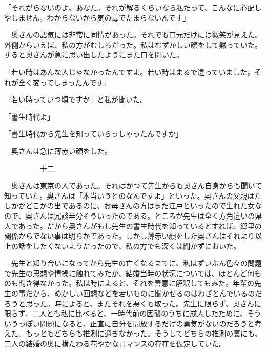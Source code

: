 \documentclass[a4j,onecolumn]{tarticle}
\begin{document}
「それがらないのよ、\hbox{}あなた。\hbox{}それが解るくらいなら私だって、\hbox{}こんなに心配しやしません。\hbox{}わからないから気の毒でたまらないんです」\par{}
　奥さんの語気には非常に同情があった。\hbox{}それでも口元だけには微笑が見えた。\hbox{}外側からいえば、\hbox{}私の方がむしろだった。\hbox{}私はむずかしい顔をして黙っていた。\hbox{}すると奥さんが急に思い出したようにまた口を開いた。\hbox{}\par{}
「若い時はあんな人じゃなかったんですよ。\hbox{}若い時はまるで違っていました。\hbox{}それが全く変ってしまったんです」\par{}
「若い時っていつ頃ですか」と私が聞いた。\hbox{}\par{}
「書生時代よ」\par{}
「書生時代から先生を知っていらっしゃったんですか」\par{}
　奥さんは急に薄赤い顔をした。\hbox{}\par{}\par{}　　　　　十二
\par{}
　奥さんは東京の人であった。\hbox{}それはかつて先生からも奥さん自身からも聞いて知っていた。\hbox{}奥さんは「本当いうとのなんですよ」といった。\hbox{}奥さんの父親はたしかかどこかの出であるのに、\hbox{}お母さんの方はまだ江戸といったので生れた女なので、\hbox{}奥さんは冗談半分そういったのである。\hbox{}ところが先生は全く方角違いの県人であった。\hbox{}だから奥さんがもし先生の書生時代を知っているとすれば、\hbox{}郷里の関係からでない事は明らかであった。\hbox{}しかし薄赤い顔をした奥さんはそれより以上の話をしたくないようだったので、\hbox{}私の方でも深くは聞かずにおいた。\hbox{}\par{}
　先生と知り合いになってから先生の亡くなるまでに、\hbox{}私はずいぶん色々の問題で先生の思想や情操に触れてみたが、\hbox{}結婚当時の状況については、\hbox{}ほとんど何ものも聞き得なかった。\hbox{}私は時によると、\hbox{}それを善意に解釈してもみた。\hbox{}年輩の先生の事だから、\hbox{}めかしい回想などを若いものに聞かせるのはわざとんでいるのだろうと思った。\hbox{}時によると、\hbox{}またそれを悪くも取った。\hbox{}先生に限らず、\hbox{}奥さんに限らず、\hbox{}二人とも私に比べると、\hbox{}一時代前の因襲のうちに成人したために、\hbox{}そういうっぽい問題になると、\hbox{}正直に自分を開放するだけの勇気がないのだろうと考えた。\hbox{}もっともどちらも推測に過ぎなかった。\hbox{}そうしてどちらの推測の裏にも、\hbox{}二人の結婚の奥に横たわる花やかなロマンスの存在を仮定していた。\hbox{}\par{}
\end{document}
